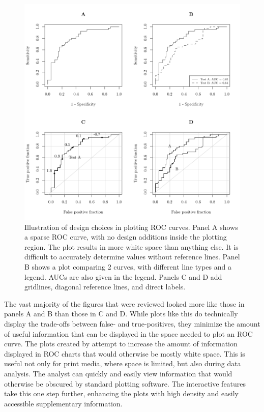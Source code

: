 \documentclass[codesnippet]{jss}
\begin{document}
\begin{Schunk}
\begin{figure}
\includegraphics{figure/figure1-1} \caption[Illustration of design choices in plotting ROC curves]{Illustration of design choices in plotting ROC curves. Panel A shows a sparse ROC curve, with no design additions inside the plotting region. The plot results in more white space than anything else. It is difficult to accurately determine values without reference lines. Panel B shows a plot comparing 2 curves, with different line types and a legend. AUCs are also given in the legend. Panels C and D add gridlines, diagonal reference lines, and direct labels. \label{figure1}}\label{fig:figure1}
\end{figure}
\end{Schunk}

The vast majority of the figures that were reviewed looked more like
those in panels A and B than those in C and D. While plots like this do
technically display the trade-offs between false- and true-positives,
they minimize the amount of useful information that can be displayed in
the space needed to plot an ROC curve. The plots created by
 attempt to increase the amount of information displayed in
ROC charts that would otherwise be mostly white space. This is useful
not only for print media, where space is limited, but also during data
analysis. The analyst can quickly and easily view information that would
otherwise be obscured by standard plotting software. The interactive
features take this one step further, enhancing the plots with high
density and easily accessible supplementary information.
\end{document}

